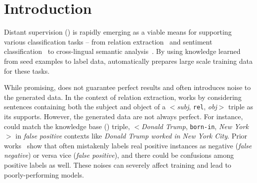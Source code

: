 \section{Introduction}

Distant supervision (\DS) is rapidly emerging as a viable means for supporting various classification tasks -- from relation extraction~\cite{mintz2009distant} and sentiment classification~\cite{go2009twitter} to cross-lingual semantic
analysis~\cite{fang2016learning}.
By using knowledge learned from seed examples to label data, \DS automatically prepares large scale training data for these tasks.




While promising, \DS does not guarantee perfect results and often introduces noise to the
generated data. In the context of relation extraction, 
\DS works by considering sentences containing both the subject and object of a $<$\emph{subj}, \texttt{rel}, \emph{obj}$>$ triple as its supports. However, the generated data are not always perfect. For instance,  
\DS could match the knowledge base (\KB) triple, $<$\emph{Donald Trump},
\texttt{born-in}, \emph{New York}$>$  in \emph{false positive} contexts like \emph{Donald Trump worked in New York City}.
Prior works~\cite{takamatsu2012reducing,ritter2013modeling} show that \DS often mistakenly labels real positive instances as negative (\emph{false negative}) or
versa vice (\emph{false positive}), and there could be  confusions among positive labels as well. 
These noises can severely affect training and lead to poorly-performing models.

